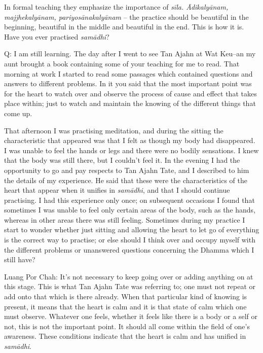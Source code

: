 In formal teaching they emphasize the importance of \emph{sīla.
Ādikalyānam, majjhekalyānam, pariyosānakalyānam} -- the practice should
be beautiful in the beginning, beautiful in the middle and beautiful in
the end. This is how it is. Have you ever practised \emph{samādhi}?

Q: I am still learning. The day after I went to see Tan Ajahn at Wat
Keu--an my aunt brought a book containing some of your teaching for me
to read. That morning at work I started to read some passages which
contained questions and answers to different problems. In it you said
that the most important point was for the heart to watch over and
observe the process of cause and effect that takes place within; just to
watch and maintain the knowing of the different things that come up.

That afternoon I was practising meditation, and during the sitting the
characteristic that appeared was that I felt as though my body had
disappeared. I was unable to feel the hands or legs and there were no
bodily sensations. I knew that the body was still there, but I couldn't
feel it. In the evening I had the opportunity to go and pay respects to
Tan Ajahn Tate, and I described to him the details of my experience. He
said that these were the characteristics of the heart that appear when
it unifies in \emph{samādhi}, and that I should continue practising. I
had this experience only once; on subsequent occasions I found that
sometimes I was unable to feel only certain areas of the body, such as
the hands, whereas in other areas there was still feeling. Sometimes
during my practice I start to wonder whether just sitting and allowing
the heart to let go of everything is the correct way to practise; or
else should I think over and occupy myself with the different problems
or unanswered questions concerning the Dhamma which I still have?

Luang Por Chah: It's not necessary to keep going over or adding anything
on at this stage. This is what Tan Ajahn Tate was referring to; one must
not repeat or add onto that which is there already. When that particular
kind of knowing is present, it means that the heart is calm and it is
that state of calm which one must observe. Whatever one feels, whether
it feels like there is a body or a self or not, this is not the
important point. It should all come within the field of one's awareness.
These conditions indicate that the heart is calm and has unified in
\emph{samādhi}.

